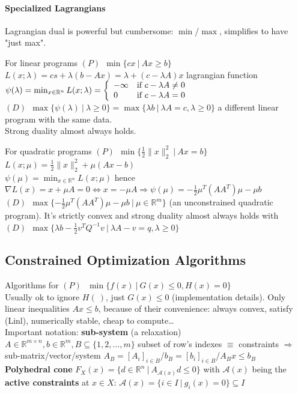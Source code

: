 \documentclass[10pt]{report}
\begin{document}
\paragraph{Specialized Lagrangians} Lagrangian dual is powerful but cumbersome: $\min$/$\max$, simplifies to have "just max".\begin{list}{}{}
	\item For linear programs $(P)\:\:\min\{cx\:|\:Ax\geq b\}$\\
	$L(x;\lambda) = cs + \lambda(b-Ax)=\lambda +(c-\lambda A)x$ lagrangian function\\
	$\psi(\lambda)=\min_{x\in \mathbb{R}^n} L(x;\lambda)=\left\{\begin{array}{l l}
	-\infty& \text{if }c-\lambda A\neq 0\\
	0& \text{if }c-\lambda A= 0\\
	\end{array}\right.$\\
	$(D)\:\:\max\{\psi(\lambda)\:|\:\lambda\geq 0\}=\max\{\lambda b\:|\:\lambda A=c, \lambda\geq 0\}$ a different linear program with the same data.\\
	Strong duality almost always holds.
	\item For quadratic programs $(P)\:\:\min\{\frac{1}{2}\|x\|_2^2\:|\:Ax = b\}$\\
	 $L(x;\mu)=\frac{1}{2}\|x\|_2^2+\mu(Ax-b)$\\
	 $\psi(\mu)=\min_{x\in \mathbb{R}^n} L(x;\mu)$ hence $\nabla L(x)=x+\mu A = 0 \Leftrightarrow x = - \mu A\Rightarrow \psi(\mu)=-\frac{1}{2}\mu^T(AA^T)\mu - \mu b$\\
	 $(D)\:\:\max\{-\frac{1}{2}\mu^T(AA^T)\mu-\mu b\:|\:\mu \in \mathbb{R}^m\}$ (an unconstrained quadratic program). It's strictly convex and strong duality almost always holds with $(D)\:\:\max\{\lambda b-\frac{1}{2}v^TQ^{-1}v\:|\:\lambda A-v=q, \lambda\geq 0\}$
\end{list}
\subsection{Constrained Optimization Algorithms} Algorithms for $(P)\:\:\:\min\{f(x)\:|\:G(x)\leq 0, H(x) = 0\}$\\
Usually ok to ignore $H(\:)$, just $G(x)\leq 0$ (implementation details). Only linear inequalities $Ax\leq b$, because of their convenience: always convex, satisfy (Linl), numerically stable, cheap to compute\ldots\\
Important notation: \textbf{sub-system} (a relaxation) $A\in \mathbb{R}^{m\times n}, b\in \mathbb{R}^m, B\subseteq\{1,2,\ldots,m\}$ subset of row's indexes $\equiv$ constraints $\Rightarrow$ sub-matrix/vector/system $A_B=[A_i]_{i\in B}$/$b_B=[b_i]_{i\in B}$/$A_Bx \leq b_B$\\
\textbf{Polyhedral cone} $F_X(x)=\{d\in \mathbb{R}^n\:|\:A_{\mathscr{A}(x)} d\leq 0\}$ with $\mathscr{A}(x)$ being the 
\textbf{active constraints} at $x\in X$: $\mathscr{A}(x) = \{i\in I\:|\:g_i(x)=0\}\subseteq I$
\end{document}

